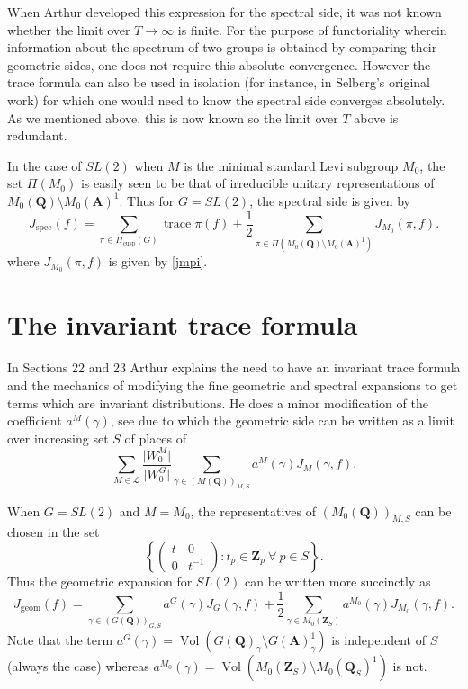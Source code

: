 \documentclass{ims9x6}
\def\A{\mathbf A}
\def\Q{\mathbf Q}
\def\Z{\mathbf Z}
\def\LLL{\mathcal L}
\def\bs{\setminus}
\def\mod#1{\lvert #1 \rvert} %
\def\trace{\operatorname{trace}}
\def\vol{\operatorname{Vol}}
\begin{document}
When Arthur developed this expression for the spectral side, it was not known whether the limit over $T \to \infty$ is finite. For the purpose of functoriality wherein information about the spectrum of two groups is obtained by comparing their geometric sides, one does not require this absolute convergence. However the trace formula can also be used in isolation (for instance, in Selberg's original work) for which one would need to know the spectral side converges absolutely. As we mentioned above, this is now known \cite{FLM} so the limit over $T$ above is redundant. 

In the case of $SL(2)$ when $M$ is the minimal standard Levi subgroup $M_0$, the set $\Pi(M_0)$ is easily seen to be that of irreducible unitary representations of $M_0(\Q)\bs M_0(\A)^1$. Thus for $G = SL(2)$, the spectral side is given by
\begin{equation} \label{spec}
	J_{\text{spec}}(f) = \sum_{\pi \in \Pi_{\text{cusp}}(G)} \trace \pi(f) + \frac{1}{2}
		\sum_{\pi \in \Pi(M_0(\Q)\bs M_0(\A)^1)} J_{M_0}(\pi, f). 
\end{equation}
where $J_{M_0}(\pi, f)$ is given by \cref{jmpi}. 

\section{The invariant trace formula}

In Sections 22 and 23 Arthur explains the need to have an invariant trace formula and the mechanics of modifying the fine geometric and spectral expansions to get terms which are invariant distributions. He does a minor modification of the coefficient $a^M(\gamma)$, see \cite[Equation (22.2)]{clay} due to which the geometric side can be written as a limit over increasing set $S$ of places of
\[ \sum_{M \in \LLL} \frac{\mod{W_0^M}}{\mod{W_0^G}} \sum_{\gamma \in (M(\Q))_{M, S}} a^M(\gamma) J_M(\gamma, f). \]

When $G=SL(2)$ and $M=M_0$, the representatives of $(M_0(\Q))_{M, S}$ can be chosen in the set 
\[ \left \{ \begin{pmatrix} t & 0 \\ 0 & t^{-1} \end{pmatrix} : t_p \in \Z_p \ \forall \ p \in S \right \}. \]
Thus the geometric expansion for $SL(2)$ can be written more succinctly as  
\[ J_{\text{geom}}(f) = \sum_{\gamma \in (G(\Q))_{G, S}} a^G(\gamma) J_G(\gamma, f) + 
		\frac{1}{2} \sum_{\gamma \in M_0(\Z_S)} a^{M_0}(\gamma) J_{M_0}(\gamma, f). \]
Note that the term $a^G(\gamma) = \vol(G(\Q)_\gamma \bs G(\A)^1_\gamma)$ is independent of $S$ (always the case) whereas $a^{M_0}(\gamma) = \vol (M_0(\Z_S)\bs M_0(\Q_S)^1)$ is not. 
\end{document}
